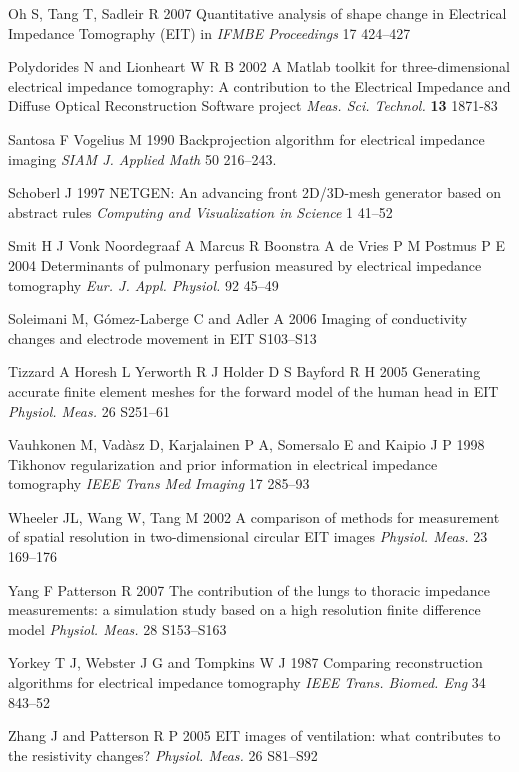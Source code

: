 \documentclass[12pt]{iopart}
\begin{document}
\item[]
Oh S, Tang T, Sadleir R 2007
Quantitative analysis of shape change in Electrical Impedance Tomography (EIT)
in {\em IFMBE Proceedings}
17 424--427

\item[]
Polydorides N and Lionheart W R B 2002 A Matlab toolkit for
three-dimensional electrical impedance tomography: A contribution
to the Electrical Impedance and Diffuse Optical Reconstruction
Software project {\em Meas. Sci. Technol.} {\bf 13} 1871-83

\item[]
Santosa F Vogelius M 1990
Backprojection algorithm for electrical impedance imaging
{\em SIAM J. Applied Math}
50 216--243. 

\item[]
Schoberl J 1997
NETGEN: An advancing front 2D/3D-mesh generator based on abstract rules
{\em Computing and Visualization in Science}
1 41--52 

\item[]
Smit H J
Vonk Noordegraaf A
Marcus R
Boonstra A
de Vries P M 
Postmus P E
2004
Determinants of pulmonary perfusion measured by electrical impedance tomography
{\em Eur. J. Appl. Physiol.}
92 45--49

\item[]
Soleimani M, G\'omez-Laberge C and Adler A 2006 Imaging of
conductivity changes and electrode movement in EIT 
S103--S13

\item[]
Tizzard A Horesh L Yerworth R J Holder D S Bayford R H 2005
Generating accurate finite element meshes for the forward
model of the human head in EIT
{\em Physiol. Meas.}
 26 S251--61 

\item[]
Vauhkonen M, Vad\`asz D, Karjalainen P A, Somersalo E and
Kaipio J P 1998
 Tikhonov regularization and prior information in
electrical impedance tomography
 {\em IEEE Trans Med Imaging}
17 285--93

\item[]
Wheeler JL, Wang W, Tang M 2002
A comparison of methods for measurement of spatial resolution in two-dimensional circular EIT images
{\em Physiol. Meas.}
23 169--176

\item[]
Yang F  Patterson R 2007
The contribution of the lungs to thoracic impedance
measurements: a simulation study based on a high
resolution finite difference model
{\em Physiol. Meas.}
28 S153--S163

\item[]
Yorkey T J, Webster J G and Tompkins W J 1987
Comparing reconstruction algorithms for electrical
impedance tomography
{\em IEEE Trans. Biomed. Eng}
34 843--52


\item[]
Zhang J and Patterson R P 2005 EIT images of ventilation: what
contributes to the resistivity changes?
{\em Physiol. Meas.}
 26 S81--S92

\endrefs
\end{document}
